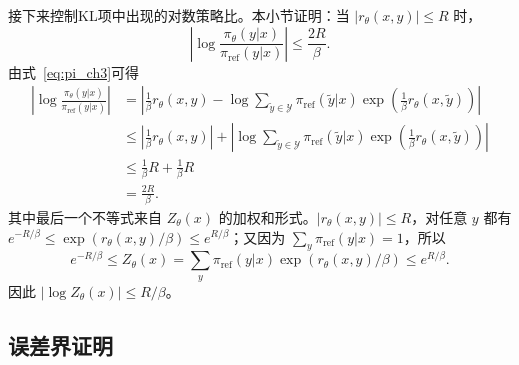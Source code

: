 接下来控制KL项中出现的对数策略比。本小节证明：当 $|r_\theta(x,y)|\le R$ 时，
\begin{equation}
    \left|\log\frac{\pi_\theta(y|x)}{\pi_{\mathrm{ref}}(y|x)}\right|
    \le \frac{2R}{\beta}.
\end{equation}
由式~\eqref{eq:pi_ch3}可得
\begin{equation}
\begin{aligned}
\left|\log\frac{\pi_\theta(y|x)}{\pi_{\mathrm{ref}}(y|x)}\right|
&=\left|\frac{1}{\beta}r_\theta(x,y)-
\log\sum_{\tilde{y}\in\mathcal{Y}}\pi_{\mathrm{ref}}(\tilde{y}|x)
\exp\left(\frac{1}{\beta}r_\theta(x,\tilde{y})\right)\right|\\
&\le \left|\frac{1}{\beta}r_\theta(x,y)\right|
+\left|\log\sum_{\tilde{y}\in\mathcal{Y}}\pi_{\mathrm{ref}}(\tilde{y}|x)
\exp\left(\frac{1}{\beta}r_\theta(x,\tilde{y})\right)\right|\\
&\le \frac{1}{\beta}R+\frac{1}{\beta}R\\
&=\frac{2R}{\beta}.
\end{aligned}
\label{eq:log_ratio_bound}
\end{equation}
其中最后一个不等式来自 $Z_\theta(x)$ 的加权和形式。$|r_\theta(x,y)|\le R$，对任意 $y$ 都有
$e^{-R/\beta}\le \exp(r_\theta(x,y)/\beta)\le e^{R/\beta}$；又因为
$\sum_y\pi_{\mathrm{ref}}(y|x)=1$，所以
\begin{equation}
    e^{-R/\beta}
    \le
    Z_\theta(x)
    =
    \sum_y\pi_{\mathrm{ref}}(y|x)\exp(r_\theta(x,y)/\beta)
    \le
    e^{R/\beta}.
\end{equation}
因此 $|\log Z_\theta(x)|\le R/\beta$。

\subsection{误差界证明}

